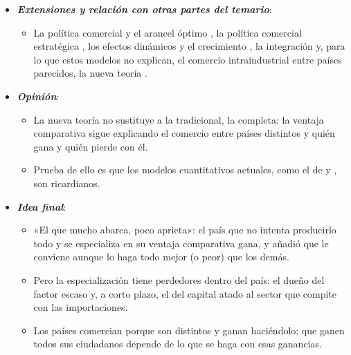 \documentclass[11pt]{article}
\begin{document}
\begin{itemize}
\begin{itemize}
  \item Sus resultados distributivos explican por qué el librecambio, que beneficia al país, tiene siempre detractores.
  \end{itemize}
\item \textbf{\emph{Extensiones y relación con otras partes del temario}}:
  \begin{itemize}
  \item La política comercial y el arancel óptimo , la política comercial estratégica , los efectos dinámicos y el crecimiento , la integración  y, para lo que estos modelos no explican, el comercio intraindustrial entre países parecidos, la nueva teoría .
  \end{itemize}
\item \textbf{\emph{Opinión}}:
  \begin{itemize}
  \item La nueva teoría no sustituye a la tradicional, la completa: la ventaja comparativa sigue explicando el comercio entre países distintos y quién gana y quién pierde con él.

  \item Prueba de ello es que los modelos cuantitativos actuales, como el de  y , son ricardianos.
  \end{itemize}
\item \textbf{\emph{Idea final}}:
  \begin{itemize}
  \item «El que mucho abarca, poco aprieta»: el país que no intenta producirlo todo y se especializa en su ventaja comparativa gana, y  añadió que le conviene aunque lo haga todo mejor (o peor) que los demás.

  \item Pero la especialización tiene perdedores dentro del país: el dueño del factor escaso y, a corto plazo, el del capital atado al sector que compite con las importaciones.

  \item Los países comercian porque son distintos y ganan haciéndolo; que ganen todos sus ciudadanos depende de lo que se haga con esas ganancias.
  \end{itemize}
\end{itemize}
\end{document}
